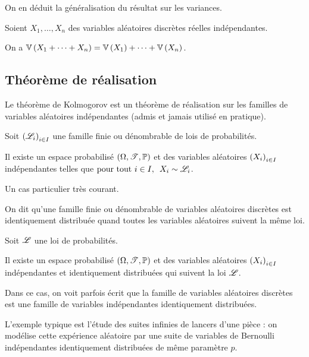 On en déduit la généralisation du résultat sur les variances.

\begin{prop}
Soient \(X_1,\dots,X_n\) des variables aléatoires discrètes réelles indépendantes.

On a \(\operatorname{\mathbb{V}}\left(X_1+\dots+X_n\right)=\operatorname{\mathbb{V}}\left(X_1\right)+\dots+\operatorname{\mathbb{V}}\left(X_n\right)\).
\end{prop}

\subsection{Théorème de réalisation}

Le théorème de Kolmogorov est un théorème de réalisation sur les familles de variables aléatoires indépendantes (admis et jamais utilisé en pratique).

\begin{theo}
Soit \(\left(\mathscr{L}_i\right)_{i\in I}\) une famille finie ou dénombrable de lois de probabilités.

Il existe un espace probabilisé \(\anneau{\Omega}[\fami{T}][\prem]\) et des variables aléatoires \(\left(X_i\right)_{i\in I}\) indépendantes telles que \(\quantifs{\tpt i\in I}X_i\sim\fami{L}_i\).
\end{theo}

Un cas particulier très courant.

\begin{defi}
On dit qu'une famille finie ou dénombrable de variables aléatoires discrètes est identiquement distribuée quand toutes les variables aléatoires suivent la même loi.
\end{defi}

\begin{theo}
Soit \(\mathscr{L}\) une loi de probabilités.

Il existe un espace probabilisé \(\anneau{\Omega}[\fami{T}][\prem]\) et des variables aléatoires \(\left(X_i\right)_{i\in I}\) indépendantes et identiquement distribuées qui suivent la loi \(\mathscr{L}\).
\end{theo}

Dans ce cas, on voit parfois écrit que la famille de variables aléatoires discrètes est une famille de variables indépendantes identiquement distribuées.

L'exemple typique est l'étude des suites infinies de lancers d'une pièce : on modélise cette expérience aléatoire par une suite de variables de Bernoulli indépendantes identiquement distribuées de même paramètre \(p\).


